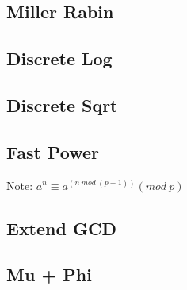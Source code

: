 \documentclass[a4paper,10pt,twocolumn,oneside]{article}
\begin{document}
\subsection{Miller Rabin}


\subsection{Discrete Log}


\subsection{Discrete Sqrt}


\subsection{Fast Power}
{ \normalsize
Note: $a^n \equiv a^{(n \ mod \ (p-1))} (mod \ p)$
}

\subsection{Extend GCD}


\subsection{Mu + Phi}

\end{document}

